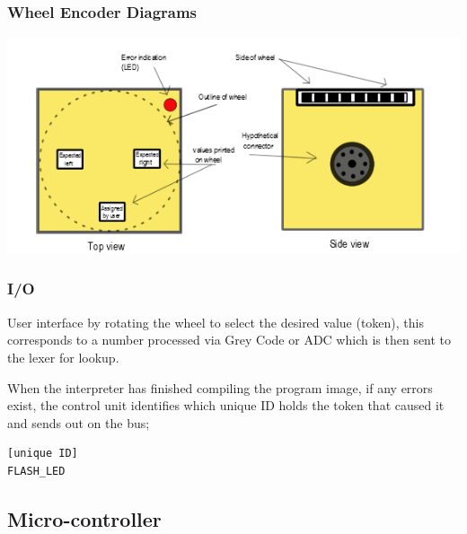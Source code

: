 \subsubsection{Wheel Encoder Diagrams}
\includegraphics{BlkFace.png}
\subsubsection{I/O}
User interface by rotating the wheel to select the desired value (token), this corresponds to a number processed via Grey Code or ADC which is then sent to the lexer for lookup.

When the interpreter has finished compiling the program image, if any errors exist, the control unit identifies which unique ID holds the token that caused it and sends out on the bus;
\begin{verbatim}
[unique ID]
FLASH_LED
\end{verbatim}

\subsection{Micro-controller}


